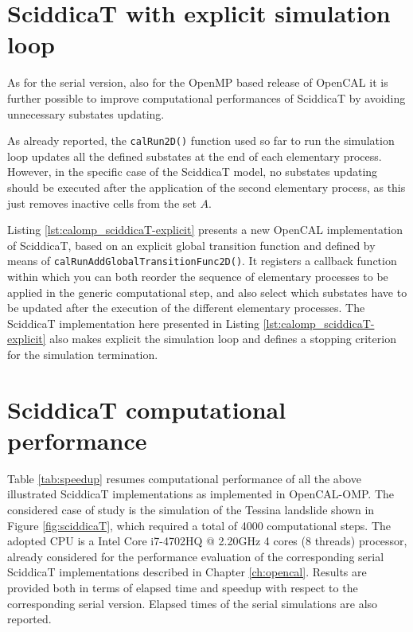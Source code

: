\section{SciddicaT with explicit simulation loop}

As for the serial version, also for the OpenMP based release of
OpenCAL it is further possible to improve computational performances of
SciddicaT by avoiding unnecessary substates updating.

As already reported, the \verb'calRun2D()' function used so far to
run the simulation loop updates all the defined substates at the end
of each elementary process. However, in the specific case of the
SciddicaT model, no substates updating should be executed after
the application of the second elementary process, as this just removes
inactive cells from the set $A$.

Listing \ref{lst:calomp_sciddicaT-explicit} presents a new OpenCAL implementation of SciddicaT, based on an explicit global
transition function and defined by means of
\verb'calRunAddGlobalTransitionFunc2D()'. It registers a callback
function within which you can both reorder the sequence of elementary
processes to be applied in the generic computational step, and also
select which substates have to be updated after the execution of the
different elementary processes. The SciddicaT implementation here
presented in Listing \ref{lst:calomp_sciddicaT-explicit} also
makes explicit the simulation loop and defines a stopping criterion for
the simulation termination.




\section{SciddicaT computational performance}

Table \ref{tab:speedup} resumes computational performance of all the
above illustrated SciddicaT implementations as implemented in
OpenCAL-OMP. The considered case of study is the simulation of the
Tessina landslide shown in Figure \ref{fig:sciddicaT}, which required
a total of 4000 computational steps. The adopted CPU is a Intel Core
i7-4702HQ @ 2.20GHz 4 cores (8 threads) processor, already considered
for the performance evaluation of the corresponding serial SciddicaT
implementations described in Chapter \ref{ch:opencal}. Results are
provided both in terms of elapsed time and speedup with respect to
the corresponding serial version. Elapsed times of the serial
simulations are also reported.

